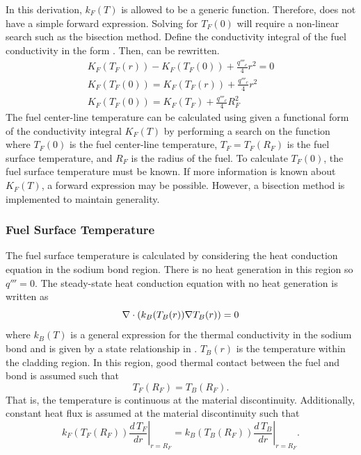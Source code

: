       In this derivation, $k_F(T)$ is allowed to be a generic function. 
      Therefore,  does not have a simple forward 
      expression. Solving for $T_F(0)$ will require a non-linear search such as
      the bisection method. Define the conductivity integral of the fuel
      conductivity in the form .
      Then,  can be rewritten.
      \begin{gather}
        K_F(T_F(r)) - K_F(T_F(0)) + \frac{q'''_c}{4} r^2 = 0 \\
        \label{eq:tfuel_r}
        K_F(T_F(0)) = K_F(T_F(r)) + \frac{q'''_c}{4} r^2 \\
        \label{eq:tcl_conductivity_integral}
        K_F(T_F(0)) = K_F(T_F) + \frac{q'''_c}{4} R_F^2
      \end{gather}
      The fuel center-line temperature can be calculated using
       given a functional form of the
      conductivity integral $K_F(T)$ by performing a search on the function
      where $T_F(0)$ is the fuel center-line temperature, $T_F=T_F(R_F)$ is the
      fuel surface temperature, and $R_F$ is the radius of the fuel. To
      calculate $T_F(0)$, the fuel surface temperature must be known.
      If more information is known about $K_F(T)$, a forward expression
      may be possible. However, a bisection method is implemented to maintain
      generality.

    \subsubsection{Fuel Surface Temperature}
      The fuel surface temperature is calculated by considering the heat
      conduction equation in the sodium bond region. There is no heat generation
      in this region so $q'''=0$.
      The steady-state heat conduction equation with no heat generation is
      written as
      \begin{equation}
        \label{eq:tc_grad}
        \mathbf{\nabla} \cdot (k_B(T_B(r)) \mathbf{\nabla} T_B(r)) = 0
      \end{equation}
      where $k_B(T)$ is a general expression for the thermal conductivity in the
      sodium bond and is given by a state relationship in \cite{sodiumProp}.
      $T_B(r)$ is the temperature within the cladding region.
      In this region, good thermal contact between the fuel and bond is
      assumed such that
      \begin{equation}
        \label{eq:rf_temp_continuity}
        T_F(R_F)=T_B(R_F).
      \end{equation}
      That is, the temperature is 
      continuous at the material discontinuity. Additionally, constant heat flux
      is assumed at the material discontinuity such that
      \begin{equation}
        \label{eq:rf_flux_continuity}
        k_F(T_F(R_F)) \left.\frac{d\,T_F}{dr}\right|_{r=R_F} = 
          k_B(T_B(R_F)) \left.\frac{d\,T_B}{dr}\right|_{r=R_F}.
      \end{equation}

